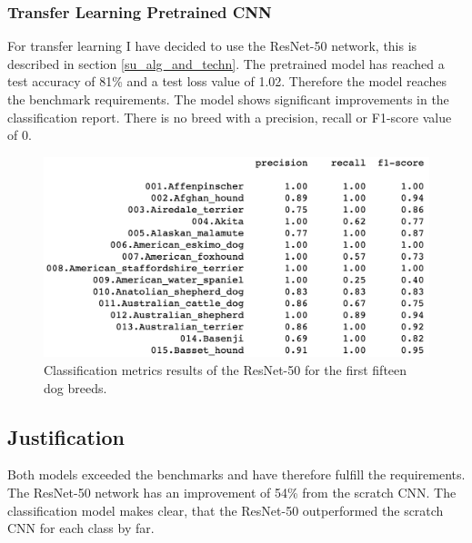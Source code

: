 \documentclass{article}
\begin{document}
\subsubsection{Transfer Learning Pretrained CNN}
For transfer learning I have decided to use the ResNet-50 network, this is described in section \ref{su_alg_and_techn}. The pretrained model has reached a test accuracy of 81\% and a test loss value of 1.02. Therefore the model reaches the benchmark requirements.\newline
The model shows significant improvements in the classification report. There is no breed with a precision, recall or F1-score value of 0.
\begin{figure}[h]
    \centering
    \includegraphics[scale=0.45]{./images/transfer_classification_report}
    \caption{Classification metrics results of the ResNet-50 for the first fifteen dog breeds.}
    \label{fig:scratch_cnn_class_rep}
\end{figure}

\subsection{Justification} \label{su_justification}
Both models exceeded the benchmarks and have therefore fulfill the requirements. The ResNet-50 network has an improvement of 54\% from the scratch CNN. The classification model makes clear, that the ResNet-50 outperformed the scratch CNN for each class by far.
\end{document}
